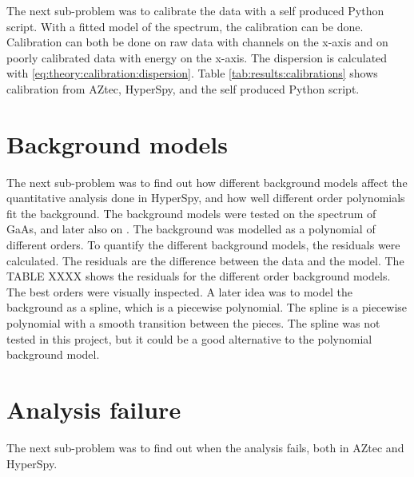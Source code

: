 The next sub-problem was to calibrate the data with a self produced Python script.
With a fitted model of the spectrum, the calibration can be done.
Calibration can both be done on raw data with channels on the x-axis and on poorly calibrated data with energy on the x-axis.
The dispersion is calculated with \cref{eq:theory:calibration:dispersion}.
Table \cref{tab:results:calibrations} shows calibration from AZtec, HyperSpy, and the self produced Python script.




%
%
\section{Background models}
\label{sec:results:background}

The next sub-problem was to find out how different background models affect the quantitative analysis done in HyperSpy, and how well different order polynomials fit the background.
The background models were tested on the spectrum of GaAs, and later also on .
The background was modelled as a polynomial of different orders.
To quantify the different background models, the residuals were calculated.
The residuals are the difference between the data and the model.
The TABLE XXXX  shows the residuals for the different order background models.
The best orders were visually inspected.
A later idea was to model the background as a spline, which is a piecewise polynomial.
The spline is a piecewise polynomial with a smooth transition between the pieces.
The spline was not tested in this project, but it could be a good alternative to the polynomial background model.


%
%
\section{Analysis failure}
\label{sec:results:failure}

The next sub-problem was to find out when the analysis fails, both in AZtec and HyperSpy.


